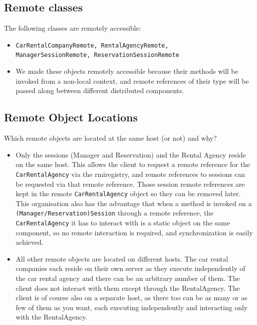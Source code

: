 \documentclass{scrartcl}
\begin{document}
\newpage
    \subsection{Remote classes}
	The following classes are remotely accessible:
	\begin{itemize}
		\item \texttt{CarRentalCompanyRemote, RentalAgencyRemote,\\ ManagerSessionRemote, ReservationSessionRemote}
		\item We made these objects remotely accessible because their
		methods will be invoked from a non-local context, and remote references
		of their type will be passed along between different distributed components.
	\end{itemize}
	
	\subsection{Remote Object Locations}
    Which remote objects are located at the same host (or not) and why? \\
	\begin{itemize}
		\item Only the sessions (Manager and Reservation) and the Rental Agency
		reside on the same host. This allows the client to request a remote reference
		for the \texttt{CarRentalAgency} via the rmiregistry, and remote references to sessions can be requested via that remote reference. Those session remote references are kept in the remote \texttt{CarRentalAgency} object so they can be removed later. This organisation also has the advantage that when a method is invoked on a \texttt{(Manager/Reservation)Session} through a remote reference, the \texttt{CarRentalAgency} it has to interact with is a static object on the same component, so no remote interaction is required, and synchronization is easily achieved.
		\item All other remote objects are located on different hosts. The car rental companies each reside on their own server as they execute independently of the car rental agency and there can be an arbitrary number of them. The client does not interact with them except through the RentalAgency.
		The client is of course also on a separate host, as there too can be as many or as few of them as you want, each executing independently and interacting only with the RentalAgency.
	\end{itemize}
\end{document}
